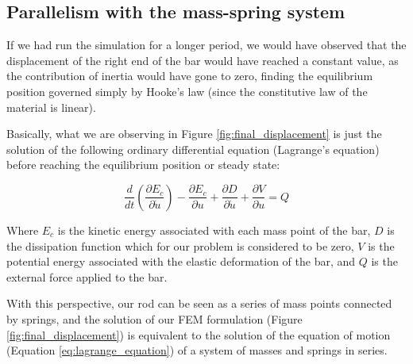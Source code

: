 \subsection{Parallelism with the mass-spring system}
\label{sub:parallelism_with_the_mass_spring_system}

If we had run the simulation for a longer period, we would have observed that the displacement of the right end of the bar would have reached a constant value, as the contribution of inertia would have gone to zero, finding the equilibrium position governed simply by Hooke's law (since the constitutive law of the material is linear).

Basically, what we are observing in Figure \ref{fig:final_displacement} is just the solution of the following ordinary differential equation (Lagrange's equation) before reaching the equilibrium position or steady state:

\begin{equation}
    \frac{d}{dt} \left( \frac{\partial E_c}{\partial \dot{u}} \right) - \frac{\partial E_c}{\partial u} + \frac{\partial D}{\partial \dot{u}} + \frac{\partial V}{\partial u} = Q
    \label{eq:lagrange_equation}
\end{equation}

Where $E_c$ is the kinetic energy associated with each mass point of the bar, $D$ is the dissipation function which for our problem is considered to be zero, $V$ is the potential energy associated with the elastic deformation of the bar, and $Q$ is the external force applied to the bar.

With this perspective, our rod can be seen as a series of mass points connected by springs, and the solution of our FEM formulation (Figure \ref{fig:final_displacement}) is equivalent to the solution of the equation of motion (Equation \ref{eq:lagrange_equation}) of a system of masses and springs in series.

